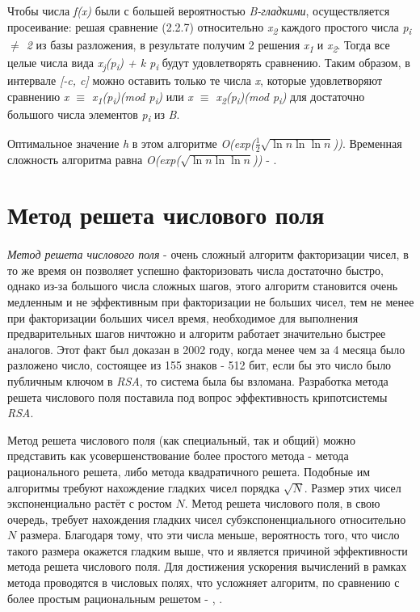   Чтобы числа \textit{f(x)} были с большей вероятностью \textit{B-гладкими}, осуществляется просеивание: решая сравнение (2.2.7) относительно \textit{x\textsubscript{2}}
  каждого простого числа \textit{p\textsubscript{i} {$\ne$} 2} из базы разложения, в результате получим 2 решения \textit{x\textsubscript{1}} и \textit{x\textsubscript{2}}. 
  Тогда все целые числа вида \textit{x\textsubscript{j}(p\textsubscript{i}) + k p\textsubscript{i}} будут удовлетворять сравнению. Таким образом, в 
  интервале \textit{[-c, c]} можно оставить только те числа \textit{x}, которые удовлетворяют сравнению \textit{x {$\equiv$} x\textsubscript{1}(p\textsubscript{i})(mod p\textsubscript{i})} 
  или \textit{x {$\equiv$} x\textsubscript{2}(p\textsubscript{i})(mod p\textsubscript{i})} для достаточно большого числа элементов 
  \textit{p\textsubscript{i}} из \textit{B}.
  
  Оптимальное значение \textit{h} в этом алгоритме \textit{O(exp({$\frac{1}{2}$}{$\sqrt{\ln{n}\ln{\ln{n}}}$}))}. Временная сложность 
  алгоритма равна \textit{O(exp({$\sqrt{\ln{n}\ln{\ln{n}}}$}))} - \cite[Глава 4, страницы 115-142]{ish11}.

\section{Метод решета числового поля}

\paragraph{} \textit{Метод решета числового поля} - очень сложный алгоритм факторизации чисел, в то же время он позволяет успешно факторизовать числа
  достаточно быстро, однако из-за большого числа сложных шагов, этого алгоритм становится очень медленным и не эффективным при факторизации
  не больших чисел, тем не менее при факторизации больших чисел время, необходимое для выполнения предварительных шагов ничтожно и алгоритм работает
  значительно быстрее аналогов. Этот факт был доказан в 2002 году, когда менее чем за 4 месяца было разложено число, состоящее из 155
  знаков - 512 бит, если бы это число было публичным ключом в \textit{RSA}, то система была бы взломана. Разработка метода решета числового поля 
  поставила под вопрос эффективность крипотсистемы \textit{RSA}.
  
  Метод решета числового поля (как специальный, так и общий) можно представить как усовершенствование более простого метода - метода 
  рационального решета, либо метода квадратичного решета. Подобные им алгоритмы требуют нахождение гладких чисел порядка {$\sqrt{N}$}. 
  Размер этих чисел экспоненциально растёт с ростом {$N$}. Метод решета числового поля, в свою очередь, требует нахождения гладких чисел 
  субэкспоненциального относительно {$N$} размера. Благодаря тому, что эти числа меньше, вероятность того, что число такого размера окажется гладким выше, что и 
  является причиной эффективности метода решета числового поля. Для достижения ускорения вычислений в рамках метода проводятся в числовых 
  полях, что усложняет алгоритм, по сравнению с более простым рациональным решетом - \cite[Глава 5, страницы 145-176]{ish11},
  \cite[Глава 6.4.2, страницы 222-225]{mah06}.
  
